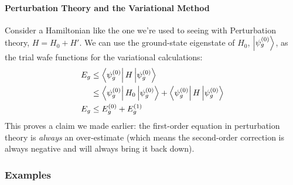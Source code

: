 \documentclass[a4paper]{article}
\begin{document}
\paragraph{Perturbation Theory and the Variational Method}
Consider a Hamiltonian like the one we're used to seeing with Perturbation
theory, $H = H_0 + H'$. We can use the ground-state eigenstate of $H_0$,
$\left\lvert \psi_g^{(0)}\right\rangle$, as the trial wafe functions for the variational
calculations:
\begin{align*}
	E_g &\leq \left\langle \psi_g^{(0)} \right\rvert H\left\lvert \psi_g^{(0)}\right\rangle\\
	    &\leq \left\langle \psi_g^{(0)} \right\rvert H_0\left\lvert \psi_g^{(0)}\right\rangle +
		  \left\langle \psi_g^{(0)} \right\rvert H\left\lvert \psi_g^{(0)}\right\rangle\\
	E_g &\leq E_g^{(0)} + E_g^{(1)}
\end{align*}
This proves a claim we made earlier: the first-order equation in perturbation
theory is \emph{always} an over-estimate (which means the second-order
correction is always negative and will always bring it back down).

\subsubsection{Examples}
\end{document}
